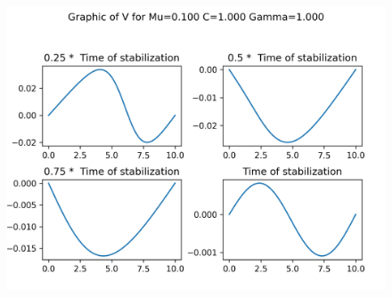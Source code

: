 \begin{figure}[H]
	\includegraphics[scale=0.5]{../graphs_data_nonsmooth_2/slices/Graph_V_mu0.100_C1.000_gamma1.000.png}
\end{figure}

